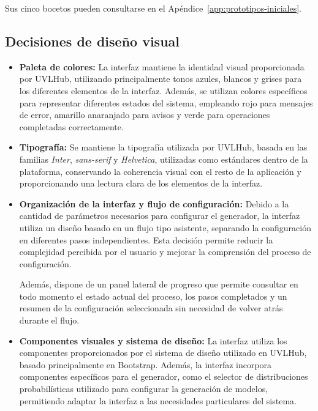 Sus cinco bocetos pueden consultarse en el Apéndice~\ref{app:prototipos-iniciales}.

\subsection{Decisiones de diseño visual}
\label{subsec:decisiones_visuales}


\begin{itemize}

    \item \textbf{Paleta de colores:} La interfaz mantiene la identidad visual proporcionada por
    UVLHub, utilizando principalmente tonos azules, blancos y grises para los diferentes
    elementos de la interfaz. Además, se utilizan colores específicos para representar
    diferentes estados del sistema, empleando rojo para mensajes de error, amarillo
    anaranjado para avisos y verde para operaciones completadas correctamente.

    \item \textbf{Tipografía:} Se mantiene la tipografía utilizada por UVLHub,
    basada en las familias \textit{Inter}, \textit{sans-serif} y \textit{Helvetica},
    utilizadas como estándares dentro de la plataforma, conservando la coherencia visual con el resto de la aplicación y proporcionando una
    lectura clara de los elementos de la interfaz.

    \item \textbf{Organización de la interfaz y flujo de configuración:} Debido a la
    cantidad de parámetros necesarios para configurar el generador, la interfaz utiliza
    un diseño basado en un flujo tipo asistente, separando la configuración en
    diferentes pasos independientes. Esta decisión permite reducir la complejidad
    percibida por el usuario y mejorar la comprensión del proceso de configuración.

    Además, dispone de un panel lateral de progreso que permite consultar en todo
    momento el estado actual del proceso, los pasos completados y un resumen de la
    configuración seleccionada sin necesidad de volver atrás durante el flujo.

    \item \textbf{Componentes visuales y sistema de diseño:} La interfaz utiliza los
    componentes proporcionados por el sistema de diseño utilizado en UVLHub, basado
    principalmente en Bootstrap. Además, la interfaz incorpora componentes específicos para el generador,
    como el selector de distribuciones probabilísticas utilizado para
    configurar la generación de modelos, permitiendo adaptar la interfaz a las
    necesidades particulares del sistema.


\end{itemize}
